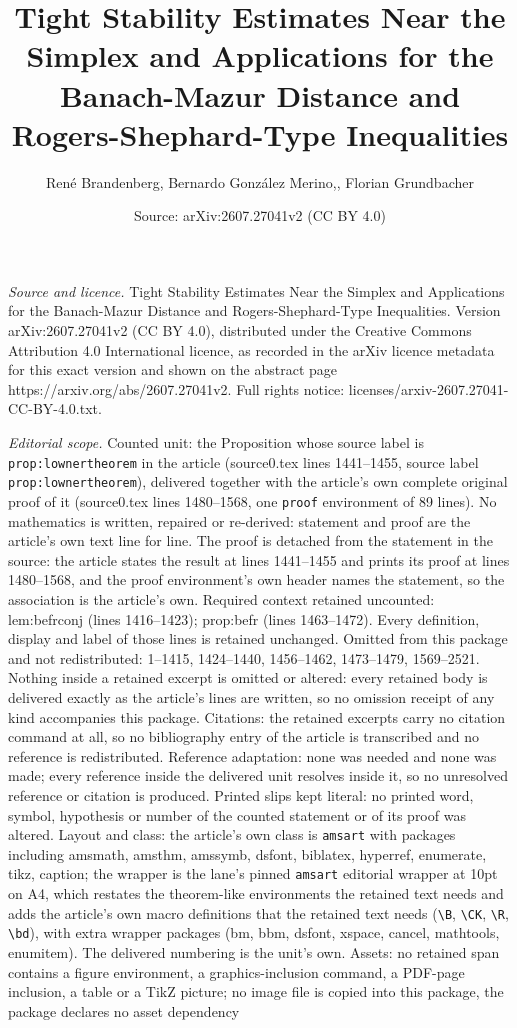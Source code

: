 \documentclass[10pt,a4paper]{amsart}
\title[Tight Stability Estimates Near the Simplex and Applications ]{Tight Stability Estimates Near the Simplex and Applications for the Banach-Mazur Distance and Rogers-Shephard-Type Inequalities}
\author{Ren\'e Brandenberg, Bernardo Gonz\'alez Merino,, Florian Grundbacher}
\date{Source: arXiv:2607.27041v2 (CC BY 4.0)}
\begin{document}
\maketitle

\noindent\emph{Source and licence.} Tight Stability Estimates Near the Simplex and Applications for the Banach-Mazur Distance and Rogers-Shephard-Type Inequalities. Version arXiv:2607.27041v2 (CC BY 4.0), distributed under the Creative Commons Attribution 4.0 International licence, as recorded in the arXiv licence metadata for this exact version and shown on the abstract page https://arxiv.org/abs/2607.27041v2. Full rights notice: licenses/arxiv-2607.27041-CC-BY-4.0.txt.\par\smallskip

\noindent\textit{Editorial scope.} Counted unit: the Proposition whose source label is \texttt{prop:lownertheorem} in the article (source0.tex lines 1441--1455, source label \texttt{prop:lownertheorem}), delivered together with the article's own complete original proof of it (source0.tex lines 1480--1568, one \texttt{proof} environment of 89 lines). No mathematics is written, repaired or re-derived: statement and proof are the article's own text line for line. The proof is detached from the statement in the source: the article states the result at lines 1441--1455 and prints its proof at lines 1480--1568, and the proof environment's own header names the statement, so the association is the article's own. Required context retained uncounted: lem:befrconj (lines 1416--1423); prop:befr (lines 1463--1472). Every definition, display and label of those lines is retained unchanged. Omitted from this package and not redistributed: 1--1415, 1424--1440, 1456--1462, 1473--1479, 1569--2521. Nothing inside a retained excerpt is omitted or altered: every retained body is delivered exactly as the article's lines are written, so no omission receipt of any kind accompanies this package. Citations: the retained excerpts carry no citation command at all, so no bibliography entry of the article is transcribed and no reference is redistributed. Reference adaptation: none was needed and none was made; every reference inside the delivered unit resolves inside it, so no unresolved reference or citation is produced. Printed slips kept literal: no printed word, symbol, hypothesis or number of the counted statement or of its proof was altered. Layout and class: the article's own class is \texttt{amsart} with packages including amsmath, amsthm, amssymb, dsfont, biblatex, hyperref, enumerate, tikz, caption; the wrapper is the lane's pinned \texttt{amsart} editorial wrapper at 10pt on A4, which restates the theorem-like environments the retained text needs and adds the article's own macro definitions that the retained text needs (\texttt{\textbackslash B}, \texttt{\textbackslash CK}, \texttt{\textbackslash R}, \texttt{\textbackslash bd}), with extra wrapper packages (bm, bbm, dsfont, xspace, cancel, mathtools, enumitem). The delivered numbering is the unit's own. Assets: no retained span contains a figure environment, a graphics-inclusion command, a PDF-page inclusion, a table or a TikZ picture; no image file is copied into this package, the package declares no asset dependency 
\end{document}
